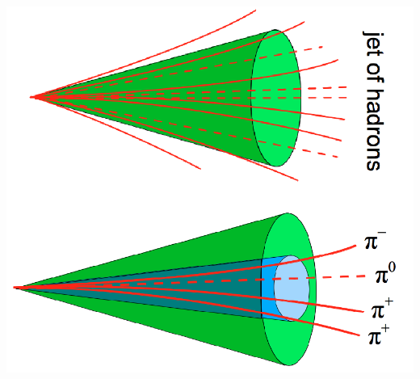 \begin{frame}{}
\begin{columns}[c]
        \includegraphics[width=\textwidth]{slides/figures/tausignature_trans.png}
    \end{columns}
    
\end{frame}